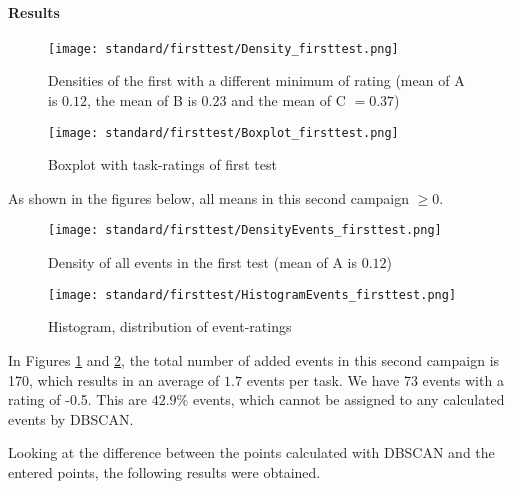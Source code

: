\paragraph{Results}

\begin{figure}[H]
    \centering
    \texttt{[image: standard/firsttest/Density\_firsttest.png]}
    \caption{Densities of the first with a different minimum of rating (mean of A is $0.12$, the mean of B is $0.23$ and the mean of C $ = 0.37$)}
\end{figure}

\begin{figure}[H]
    \centering
    \texttt{[image: standard/firsttest/Boxplot\_firsttest.png]}
    \caption{Boxplot with task-ratings of first test}
\end{figure}

As shown in the figures below, all means in this second campaign $\ge 0$.\newline

\begin{figure}[H]
    \centering
    \texttt{[image: standard/firsttest/DensityEvents\_firsttest.png]}
    \caption{Density of all events in the first test (mean of A is $0.12$)}
    \label{img:DensEvents:first}
\end{figure}

\begin{figure}[H]
    \centering
    \texttt{[image: standard/firsttest/HistogramEvents\_firsttest.png]}
    \caption{Histogram, distribution of event-ratings}
    \label{img:HistEvent:first}
\end{figure}

In Figures \ref{img:DensEvents:first} and \ref{img:HistEvent:first}, the total number of added events in this second campaign is 170, which results in an average of $1.7$ events per task. We have 73 events with a rating of -0.5. This are $42.9\%$ events, which cannot be assigned to any calculated events by DBSCAN.

Looking at the difference between the points calculated with DBSCAN and the entered points, the following results were obtained.

